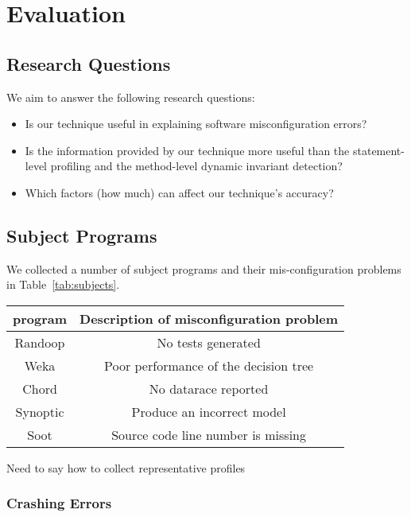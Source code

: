 \section{Evaluation}

\subsection{Research Questions}

We aim to answer the following research questions:

\begin{itemize}
\item Is our technique useful in explaining software misconfiguration errors?
\item Is the information provided by our technique more useful than the statement-level
profiling and the method-level dynamic invariant detection?
\item Which factors (how much) can affect our technique's accuracy?
\end{itemize}

\subsection{Subject Programs}

We collected a number of subject programs and their mis-configuration problems in
Table~\ref{tab:subjects}.

\begin{table}[t]
\setlength{\tabcolsep}{.94\tabcolsep}
\begin{tabular}{|c|c|}
\hline
 program & Description of misconfiguration problem \\
 \hline
 \hline
 Randoop &  No tests generated \\
\hline
 Weka &  Poor performance of the decision tree \\
\hline
 Chord &  No datarace reported \\
\hline
 Synoptic &  Produce an incorrect model \\
\hline
 Soot &  Source code line number is missing \\
\hline
\end{tabular}

\end{table}

Need to say how to collect representative profiles

\subsubsection{Crashing Errors}


